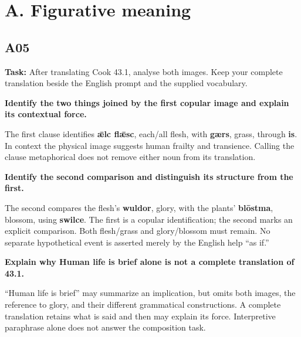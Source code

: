 \section*{A. Figurative meaning}

\subsection*{A05}

\textbf{Task:} After translating Cook 43.1, analyse both images. Keep your complete translation beside the English prompt and the supplied vocabulary.

\textbf{Identify the two things joined by the first copular image and explain its contextual force.}

The first clause identifies \textbf{ǣlc flǣsc}, each/\allowbreak{}all flesh, with \textbf{gærs}, grass, through \textbf{is}. In context the physical image suggests human frailty and transience. Calling the clause metaphorical does not remove either noun from its translation.

\textbf{Identify the second comparison and distinguish its structure from the first.}

The second compares the flesh's \textbf{wuldor}, glory, with the plants' \textbf{blōstma}, blossom, using \textbf{swilce}. The first is a copular identification; the second marks an explicit comparison. Both flesh/\allowbreak{}grass and glory/\allowbreak{}blossom must remain. No separate hypothetical event is asserted merely by the English help “as if.”

\textbf{Explain why Human life is brief alone is not a complete translation of 43.1.}

“Human life is brief” may summarize an implication, but omits both images, the reference to glory, and their different grammatical constructions. A complete translation retains what is said and then may explain its force. Interpretive paraphrase alone does not answer the composition task.

